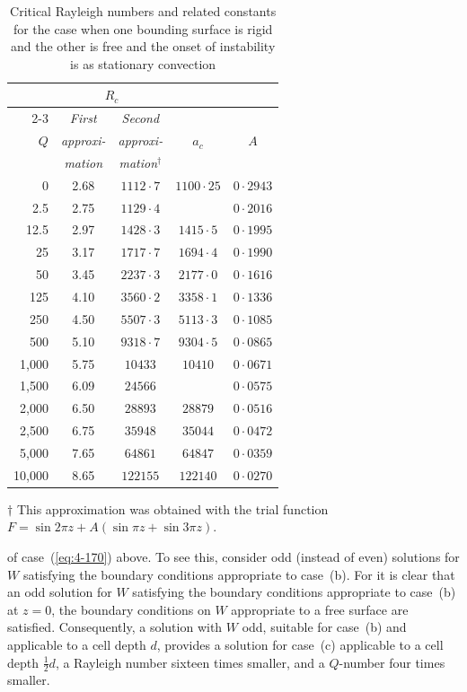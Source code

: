 \begin{table}[t]
\centering
\caption{Critical Rayleigh numbers and related constants for the case when one bounding surface is rigid and the other is free and the onset of instability is as stationary convection}
\label{tab:XVI}
\smallskip
\begin{tabular}{r@{\qquad}c@{\quad}c@{\qquad}c@{\quad}c}
\hline
& \multicolumn{2}{c}{$R_c$} & & \\
\cline{2-3}
& \emph{First} & \emph{Second} & & \\
$Q$ & \emph{approxi-} & \emph{approxi-} & $a_c$ & $A$ \\
& \emph{mation} & \emph{mation$^\dagger$} & & \\
\hline
0 & 2.68 & $1112{\cdot}7$ & $1100{\cdot}25$ & $0{\cdot}2943$ \\
2.5 & 2.75 & $1129{\cdot}4$ & & $0{\cdot}2016$ \\
12.5 & 2.97 & $1428{\cdot}3$ & $1415{\cdot}5$ & $0{\cdot}1995$ \\
25 & 3.17 & $1717{\cdot}7$ & $1694{\cdot}4$ & $0{\cdot}1990$ \\
50 & 3.45 & $2237{\cdot}3$ & $2177{\cdot}0$ & $0{\cdot}1616$ \\
125 & 4.10 & $3560{\cdot}2$ & $3358{\cdot}1$ & $0{\cdot}1336$ \\
250 & 4.50 & $5507{\cdot}3$ & $5113{\cdot}3$ & $0{\cdot}1085$ \\
500 & 5.10 & $9318{\cdot}7$ & $9304{\cdot}5$ & $0{\cdot}0865$ \\
1{,}000 & 5.75 & $10433$ & $10410$ & $0{\cdot}0671$ \\
1{,}500 & 6.09 & $24566$ & & $0{\cdot}0575$ \\
2{,}000 & 6.50 & $28893$ & $28879$ & $0{\cdot}0516$ \\
2{,}500 & 6.75 & $35948$ & $35044$ & $0{\cdot}0472$ \\
5{,}000 & 7.65 & $64861$ & $64847$ & $0{\cdot}0359$ \\
10{,}000 & 8.65 & $122155$ & $122140$ & $0{\cdot}0270$ \\
\hline
\end{tabular}

\smallskip
$\dagger$ This approximation was obtained with the trial function $F = \sin 2\pi z + A(\sin\pi z + \sin 3\pi z)$.
\end{table}
%
of case~(\ref{eq:4-170}) above. To see this, consider odd (instead of even) solutions for $W$ satisfying the boundary conditions appropriate to case~(b). For it is clear that an odd solution for $W$ satisfying the boundary conditions appropriate to case~(b) at $z=0$, the boundary conditions on $W$ appropriate to a free surface are satisfied. Consequently, a solution with $W$ odd, suitable for case~(b) and applicable to a cell depth $d$, provides a solution for case~(c) applicable to a cell depth $\tfrac{1}{2}d$, a Rayleigh number sixteen times smaller, and a $Q$-number four times smaller.

